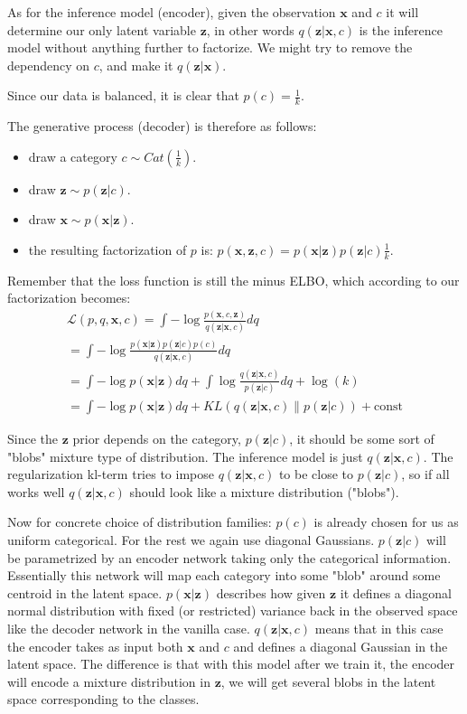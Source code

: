 \documentclass[11pt, a4paper]{report}
\theoremstyle{plain}
\theoremstyle{definition}
\theoremstyle{remark}
\newcommand{\x}{\mathbf{x}}
\newcommand{\z}{\mathbf{z}}
\newcommand{\LL}{\mathcal{L}}
\begin{document}
As for the inference model (encoder), given the observation $\x$ and $c$ it will determine
our only latent variable $\z$, in other words $q(\z | \x, c)$ is the inference
model without anything further to factorize. We might try to remove the
dependency on $c$, and make it $q(\z | \x)$.

Since our data is balanced, it is clear that $p(c) = \frac{1}{k}$.

The generative process (decoder) is therefore as follows:
\begin{itemize}
\item{} draw a category $c \sim Cat(\frac{1}{k})$.
\item{} draw $\z \sim p(\z | c)$.
\item{} draw $\x \sim p(\x | \z)$.
\item{} the resulting factorization of $p$ is:
$p(\x, \z, c) = p(\x | \z)p(\z | c)\frac{1}{k}$.
\end{itemize}

Remember that the loss function is still the minus ELBO,
which according to our factorization becomes:
\begin{equation}
\begin{aligned}
\label{eq:cvaeloss}
\LL(p,q,\x,c) = 
\int -\log \frac{p(\x,c,\z)}{q(\z | \x, c)}dq \\
= \int -\log \frac{p(\x|\z) p(\z | c) p(c)}{q(\z | \x, c)}dq \\
= \int - \log p(\x | \z)dq + \int \log \frac{q(\z | \x, c)}{p(\z | c)}dq
+ \log(k) \\
= \int - \log p(\x | \z)dq + KL(q(\z | \x, c) \| p(\z | c)) + \text{const}
\end{aligned}
\end{equation}


Since the $\z$ prior depends on the category, $p(\z | c)$, it should be some
sort of "blobs" mixture type of distribution.
The inference model is just $q(\z | \x,c)$. The regularization kl-term tries
to impose $q(\z | \x, c)$ to be close to $p(\z | c)$, so if all works well 
$q(\z | \x, c)$ should look like a mixture distribution ("blobs").

Now for concrete choice of distribution families:
$p(c)$ is already chosen for us as uniform categorical. 
For the rest we again use diagonal Gaussians.
$p(\z | c)$ will be parametrized by an encoder network taking only the
categorical information. Essentially this network will map each category into
some "blob" around some centroid in the latent space. 
$p(\x | \z)$ describes how given $\z$ it defines a diagonal normal distribution
with fixed (or restricted) variance back in the
observed space like the decoder network in the vanilla case.
$q(\z | \x, c)$ means that in this case the encoder takes as input both $\x$ and
$c$ and defines a diagonal Gaussian in the latent space.
The difference is that with this model after we train it, the encoder will
encode a mixture distribution in $\z$, we will get several blobs in the latent
space corresponding to the classes.
\end{document}
